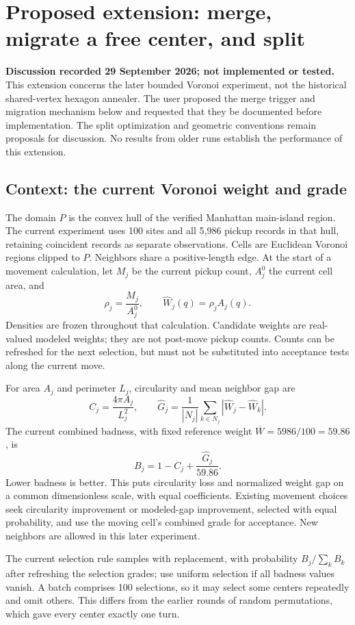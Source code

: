 \clearpage
\section{Proposed extension: merge, migrate a free center, and split}
\label{sec:merge-migrate-split}
\textbf{Discussion recorded 29 September 2026; not implemented or tested.}
This extension concerns the later bounded Voronoi experiment, not the historical
shared-vertex hexagon annealer. The user proposed the merge trigger and migration
mechanism below and requested that they be documented before implementation.
The split optimization and geometric conventions remain proposals for discussion.
No results from older runs establish the performance of this extension.

\subsection{Context: the current Voronoi weight and grade}
The domain $P$ is the convex hull of the verified Manhattan main-island region.
The current experiment uses 100 sites and all 5,986 pickup records in that hull,
retaining coincident records as separate observations. Cells are Euclidean
Voronoi regions clipped to $P$. Neighbors share a positive-length edge.
At the start of a movement calculation, let $M_j$ be the current pickup count,
$A_j^0$ the current cell area, and
\[
 \rho_j=\frac{M_j}{A_j^0},\qquad
 \widehat W_j(q)=\rho_j A_j(q).
\]
Densities are frozen throughout that calculation. Candidate weights are real-valued
modeled weights; they are not post-move pickup counts. Counts can be refreshed
for the next selection, but must not be substituted into acceptance tests along
the current move.

For area $A_j$ and perimeter $L_j$, circularity and mean neighbor gap are
\[
 C_j=\frac{4\pi A_j}{L_j^2},\qquad
 \widehat G_j=\frac{1}{|N_j|}\sum_{k\in N_j}
          |\widehat W_j-\widehat W_k|.
\]
The current combined badness, with fixed reference weight
$\overline W=5986/100=59.86$, is
\[
 B_j=1-C_j+\frac{\widehat G_j}{59.86}.
\]
Lower badness is better. This puts circularity loss and normalized weight gap
on a common dimensionless scale, with equal coefficients. Existing movement
choices seek circularity improvement or modeled-gap improvement, selected with
equal probability, and use the moving cell's combined grade for acceptance.
New neighbors are allowed in this later experiment.

The current selection rule samples with replacement, with probability
$B_j/\sum_k B_k$ after refreshing the selection grades; use uniform selection
if all badness values vanish. A batch comprises 100 selections, so it may select
some centers repeatedly and omit others. This differs from the earlier rounds
of random permutations, which gave every center exactly one turn.

